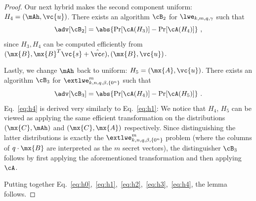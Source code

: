 \begin{proof}
Our next hybrid makes the second component uniform: $H_4=(\mAh, \vc{u})$. There exists an algorithm $\cB_2$ for $\lwe_{k,m,q,\gamma}$ such that
\begin{equation}\label{eq:h3}
\adv[\cB_2] = \abs{\Pr[\cA(H_3)]- \Pr[\cA(H_4)]}~,
\end{equation}
since $H_3, H_4$ can be computed efficiently from $(\mx{B}, \mx{B}^T\vc{s}+\veh), (\mx{B}, \vc{u})$.

Lastly, we change $\mAh$ back to uniform: $H_5 = (\mx{A}, \vc{u})$. There exists an algorithm $\cB_3$ for $\extlwe^m_{k,n,q,\beta,\{0^n\}}$ such that
\begin{equation}\label{eq:h4}
\adv[\cB_3] = \abs{\Pr[\cA(H_4)]- \Pr[\cA(H_5)]}~.
\end{equation}
Eq.~\eqref{eq:h4} is derived very similarly to Eq.~\eqref{eq:h1}: We notice that $H_4$, $H_5$ can be viewed as applying the same efficient transformation on the distributions $(\mx{C}, \mAh)$ and $(\mx{C}, \mx{A})$ respectively. Since distinguishing the latter distributions is exactly the $\extlwe^m_{k,n,q,\beta,\{0^n\}}$ problem (where the columns of $q\cdot\mx{B}$ are interpreted as the $m$ secret vectors), the distinguisher $\cB_3$ follows by first applying the aforementioned transformation and then applying~$\cA$.

Putting together Eq.~\eqref{eq:h0},~\eqref{eq:h1},~\eqref{eq:h2},~\eqref{eq:h3},~\eqref{eq:h4}, the lemma follows.
\end{proof}












